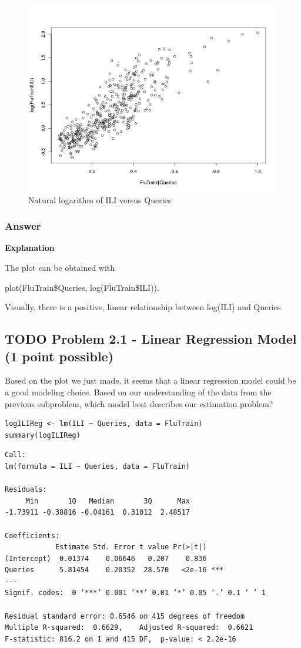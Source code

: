 \documentclass[letterpaper, 9pt, onecolumn, twoside, technote, final]{IEEEtran}
\begin{document}
\begin{figure}[htb]
\centering
\includegraphics[width=.9\linewidth]{../graphs/LogILIvsQueries.png}
\caption{\label{fig:LogILIvsQueries}Natural logarithm of ILI versus Queries}
\end{figure}

\subsubsection{Answer}
\label{sec-3-3-1}

\textbf{Explanation}

The plot can be obtained with

plot(FluTrain\$Queries, log(FluTrain\$ILI)).

Visually, there is a positive, linear relationship between log(ILI)
and Queries.

\subsection{{\bfseries\sffamily TODO} Problem 2.1 - Linear Regression Model (1 point possible)}
\label{sec-3-4}

Based on the plot we just made, it seems that a linear regression
model could be a good modeling choice. Based on our understanding of
the data from the previous subproblem, which model best describes our
estimation problem?

\begin{verbatim}
logILIReg <- lm(ILI ~ Queries, data = FluTrain)
summary(logILIReg)
\end{verbatim}

\begin{verbatim}
Call:
lm(formula = ILI ~ Queries, data = FluTrain)

Residuals:
     Min       1Q   Median       3Q      Max
-1.73911 -0.38816 -0.04161  0.31012  2.48517

Coefficients:
            Estimate Std. Error t value Pr(>|t|)
(Intercept)  0.01374    0.06646   0.207    0.836
Queries      5.81454    0.20352  28.570   <2e-16 ***
---
Signif. codes:  0 ‘***’ 0.001 ‘**’ 0.01 ‘*’ 0.05 ‘.’ 0.1 ‘ ’ 1

Residual standard error: 0.6546 on 415 degrees of freedom
Multiple R-squared:  0.6629,	Adjusted R-squared:  0.6621
F-statistic: 816.2 on 1 and 415 DF,  p-value: < 2.2e-16
\end{verbatim}
\end{document}
